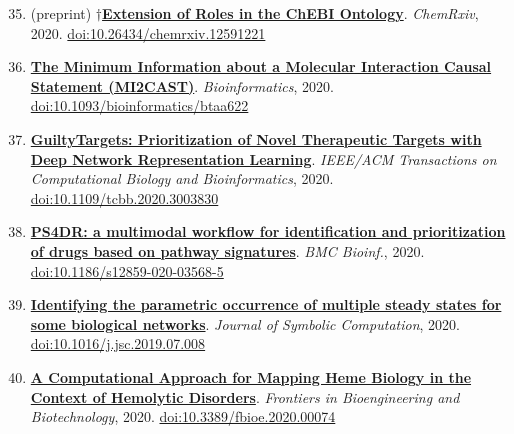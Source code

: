 \documentclass[10pt,a4paper,sans]{moderncv} %
\newcommand{\wikidata}[2]{\href{https://bioregistry.io/wikidata:#1?provider=scholia}{{#2}}}
\begin{document}
    \begin{enumerate}
    \setcounter{enumi}{34}
    \itemsep0.5em
        \item
        (preprint) $\dagger$\wikidata{Q96909013}{\textbf{Extension of Roles in the ChEBI Ontology}}.
    \textit{ChemRxiv}, 2020.  {\scriptsize \href{https://bioregistry.io/doi:10.26434/CHEMRXIV.12591221}{doi:10.26434/chemrxiv.12591221}}
        \item
        \wikidata{Q97063807}{\textbf{The Minimum Information about a Molecular Interaction Causal Statement (MI2CAST)}}.
    \textit{Bioinformatics}, 2020.  {\scriptsize \href{https://bioregistry.io/doi:10.1093/BIOINFORMATICS/BTAA622}{doi:10.1093/bioinformatics/btaa622}}
        \item
        \wikidata{Q98200725}{\textbf{GuiltyTargets: Prioritization of Novel Therapeutic Targets with Deep Network Representation Learning}}.
    \textit{IEEE/ACM Transactions on Computational Biology and Bioinformatics}, 2020.  {\scriptsize \href{https://bioregistry.io/doi:10.1109/TCBB.2020.3003830}{doi:10.1109/tcbb.2020.3003830}}
        \item
        \wikidata{Q96169295}{\textbf{PS4DR: a multimodal workflow for identification and prioritization of drugs based on pathway signatures}}.
    \textit{BMC Bioinf.}, 2020.  {\scriptsize \href{https://bioregistry.io/doi:10.1186/S12859-020-03568-5}{doi:10.1186/s12859-020-03568-5}}
        \item
        \wikidata{Q118952373}{\textbf{Identifying the parametric occurrence of multiple steady states for some biological networks}}.
    \textit{Journal of Symbolic Computation}, 2020.  {\scriptsize \href{https://bioregistry.io/doi:10.1016/J.JSC.2019.07.008}{doi:10.1016/j.jsc.2019.07.008}}
        \item
        \wikidata{Q90643177}{\textbf{A Computational Approach for Mapping Heme Biology in the Context of Hemolytic Disorders}}.
    \textit{Frontiers in Bioengineering and Biotechnology}, 2020.  {\scriptsize \href{https://bioregistry.io/doi:10.3389/FBIOE.2020.00074}{doi:10.3389/fbioe.2020.00074}}
    \end{enumerate}
\end{document}

